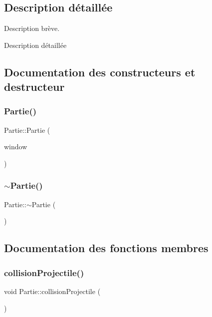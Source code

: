 \subsection{Description détaillée}
Description brève. 

Description détaillée 

\subsection{Documentation des constructeurs et destructeur}
\mbox{\label{class_partie_a4ff8a252d0ca57f42abb2285cf5ad2e0}} 
\subsubsection{\texorpdfstring{Partie()}{Partie()}}
{\footnotesize\ttfamily Partie\+::\+Partie (\begin{DoxyParamCaption}\item[{sf\+::\+Render\+Window \&}]{window }\end{DoxyParamCaption})}

\mbox{\label{class_partie_ae4afeb7336bb84427272cfb7018b5e3d}} 
\subsubsection{\texorpdfstring{$\sim$\+Partie()}{~Partie()}}
{\footnotesize\ttfamily Partie\+::$\sim$\+Partie (\begin{DoxyParamCaption}{ }\end{DoxyParamCaption})}



\subsection{Documentation des fonctions membres}
\mbox{\label{class_partie_a2ed02302df62c0867ebec0fc83078da3}} 
\subsubsection{\texorpdfstring{collision\+Projectile()}{collisionProjectile()}}
{\footnotesize\ttfamily void Partie\+::collision\+Projectile (\begin{DoxyParamCaption}{ }\end{DoxyParamCaption})}

